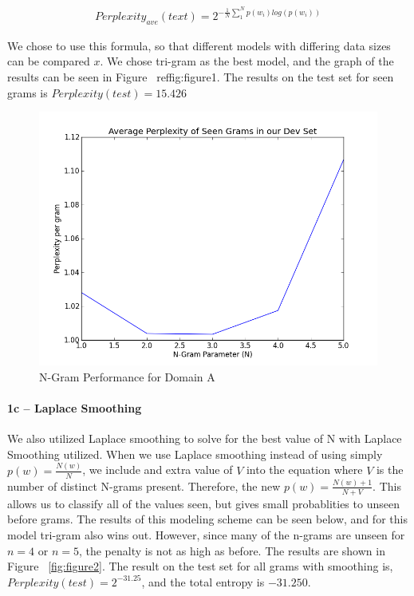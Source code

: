 \documentclass[paper=a4, fontsize=11pt]{scrartcl} %
\begin{document}
\begin{align}
Perplexity_{ave}(text) = 2^{-\frac{1}{N}\sum_1^N p(w_i)log(p(w_i))}
\end{align}

We chose to use this formula, so that different models with differing data sizes can be compared $x$.
We chose tri-gram as the best model, and the graph of the results can be seen in Figure ~ref{fig:figure1}.  The results on the test set for seen grams is $Perplexity(test)=15.426$

\begin{figure}
\centering
\includegraphics[scale=0.4]{figure_1.png}
\caption{N-Gram Performance for Domain A}
\label{fig:figure1}
\end{figure}

\paragraph{1c -- Laplace Smoothing}
We also utilized Laplace smoothing to solve for the best value of N with Laplace Smoothing utilized.  When we use Laplace smoothing instead of using simply $p(w)=\frac{N(w)}{N}$, we include and extra value of $V$ into the equation where $V$ is the number of distinct N-grams present.  Therefore, the new $p(w) = \frac{N(w)+1}{N+V}$.  This allows us to classify all of the values seen, but gives small probablities to unseen before grams.  The results of this modeling scheme can be seen below, and for this model tri-gram also wins out.  
However, since many of the n-grams are unseen for $n=4$ or $n=5$, the penalty is not as high as before.  The results are shown in Figure ~\ref{fig:figure2}.  
The result on the test set for all grams with smoothing is,  $Perplexity(test)=2^{-31.25}$, and the total entropy is $-31.250$.
\end{document}
